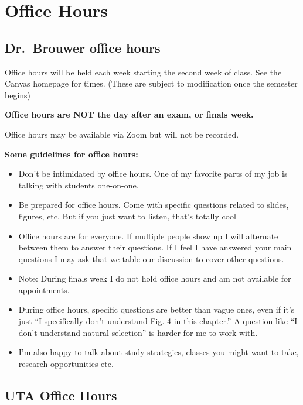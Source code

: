 \documentclass[
]{book}
\providecommand{\tightlist}{%
  \setlength{\itemsep}{0pt}\setlength{\parskip}{0pt}}
\begin{document}
\hypertarget{officehours}{%
\chapter{Office Hours}\label{officehours}}

\hypertarget{dr.-brouwer-office-hours}{%
\section{Dr.~Brouwer office hours}\label{dr.-brouwer-office-hours}}

Office hours will be held each week starting the second week of class. See the Canvas homepage for times. (These are subject to modification once the semester begins)

\textbf{Office hours are NOT the day after an exam, or finals week.}

Office hours may be available via Zoom but will not be recorded.

\textbf{Some guidelines for office hours:}

\begin{itemize}
\tightlist
\item
  Don't be intimidated by office hours. One of my favorite parts of my job is talking with students one-on-one.
\item
  Be prepared for office hours. Come with specific questions related to slides, figures, etc. But if you just want to listen, that's totally cool
\item
  Office hours are for everyone. If multiple people show up I will alternate between them to answer their questions. If I feel I have answered your main questions I may ask that we table our discussion to cover other questions.
\item
  Note: During finals week I do not hold office hours and am not available for appointments.
\item
  During office hours, specific questions are better than vague ones, even if it's just ``I specifically don't understand Fig. 4 in this chapter.'' A question like ``I don't understand natural selection'' is harder for me to work with.
\item
  I'm also happy to talk about study strategies, classes you might want to take, research opportunities etc.
\end{itemize}

\hypertarget{uta-office-hours}{%
\section{UTA Office Hours}\label{uta-office-hours}}
\end{document}
